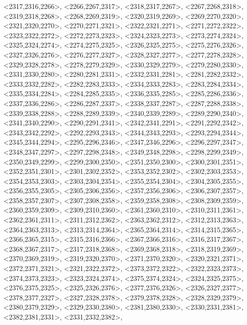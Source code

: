 \documentclass[a4paper,10pt]{article}
\begin{document}
\begin{eulernotebook}
\begin{euleroutput}
  <2317,2316,2266>,
  <2266,2267,2317>,
  <2318,2317,2267>,
  <2267,2268,2318>,
  <2319,2318,2268>,
  <2268,2269,2319>,
  <2320,2319,2269>,
  <2269,2270,2320>,
  <2321,2320,2270>,
  <2270,2271,2321>,
  <2322,2321,2271>,
  <2271,2272,2322>,
  <2323,2322,2272>,
  <2272,2273,2323>,
  <2324,2323,2273>,
  <2273,2274,2324>,
  <2325,2324,2274>,
  <2274,2275,2325>,
  <2326,2325,2275>,
  <2275,2276,2326>,
  <2327,2326,2276>,
  <2276,2277,2327>,
  <2328,2327,2277>,
  <2277,2278,2328>,
  <2329,2328,2278>,
  <2278,2279,2329>,
  <2330,2329,2279>,
  <2279,2280,2330>,
  <2331,2330,2280>,
  <2280,2281,2331>,
  <2332,2331,2281>,
  <2281,2282,2332>,
  <2333,2332,2282>,
  <2282,2283,2333>,
  <2334,2333,2283>,
  <2283,2284,2334>,
  <2335,2334,2284>,
  <2284,2285,2335>,
  <2336,2335,2285>,
  <2285,2286,2336>,
  <2337,2336,2286>,
  <2286,2287,2337>,
  <2338,2337,2287>,
  <2287,2288,2338>,
  <2339,2338,2288>,
  <2288,2289,2339>,
  <2340,2339,2289>,
  <2289,2290,2340>,
  <2341,2340,2290>,
  <2290,2291,2341>,
  <2342,2341,2291>,
  <2291,2292,2342>,
  <2343,2342,2292>,
  <2292,2293,2343>,
  <2344,2343,2293>,
  <2293,2294,2344>,
  <2345,2344,2294>,
  <2295,2296,2346>,
  <2347,2346,2296>,
  <2296,2297,2347>,
  <2348,2347,2297>,
  <2297,2298,2348>,
  <2349,2348,2298>,
  <2298,2299,2349>,
  <2350,2349,2299>,
  <2299,2300,2350>,
  <2351,2350,2300>,
  <2300,2301,2351>,
  <2352,2351,2301>,
  <2301,2302,2352>,
  <2353,2352,2302>,
  <2302,2303,2353>,
  <2354,2353,2303>,
  <2303,2304,2354>,
  <2355,2354,2304>,
  <2304,2305,2355>,
  <2356,2355,2305>,
  <2305,2306,2356>,
  <2357,2356,2306>,
  <2306,2307,2357>,
  <2358,2357,2307>,
  <2307,2308,2358>,
  <2359,2358,2308>,
  <2308,2309,2359>,
  <2360,2359,2309>,
  <2309,2310,2360>,
  <2361,2360,2310>,
  <2310,2311,2361>,
  <2362,2361,2311>,
  <2311,2312,2362>,
  <2363,2362,2312>,
  <2312,2313,2363>,
  <2364,2363,2313>,
  <2313,2314,2364>,
  <2365,2364,2314>,
  <2314,2315,2365>,
  <2366,2365,2315>,
  <2315,2316,2366>,
  <2367,2366,2316>,
  <2316,2317,2367>,
  <2368,2367,2317>,
  <2317,2318,2368>,
  <2369,2368,2318>,
  <2318,2319,2369>,
  <2370,2369,2319>,
  <2319,2320,2370>,
  <2371,2370,2320>,
  <2320,2321,2371>,
  <2372,2371,2321>,
  <2321,2322,2372>,
  <2373,2372,2322>,
  <2322,2323,2373>,
  <2374,2373,2323>,
  <2323,2324,2374>,
  <2375,2374,2324>,
  <2324,2325,2375>,
  <2376,2375,2325>,
  <2325,2326,2376>,
  <2377,2376,2326>,
  <2326,2327,2377>,
  <2378,2377,2327>,
  <2327,2328,2378>,
  <2379,2378,2328>,
  <2328,2329,2379>,
  <2380,2379,2329>,
  <2329,2330,2380>,
  <2381,2380,2330>,
  <2330,2331,2381>,
  <2382,2381,2331>,
  <2331,2332,2382>,

\end{euleroutput}
\end{eulernotebook}
\end{document}
